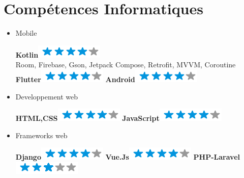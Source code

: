 \documentclass[]{friggeri-cv}
\begin{document}
\section{Compétences Informatiques}
        \vspace*{-0.45cm}
        \setlength{\columnsep}{-0.3cm}
        \begin{flushright}
        \begin{multicols}{3}
		\begin{itemize}
		
		\setlength{\itemsep}{1pt}
  		\setlength{\parskip}{0pt}
  		\setlength{\parsep}{0pt}
          
        
\item Mobile \
\begin{flushright}

\textbf{Kotlin}\includegraphics[scale=0.40]{res/img/4stars.png}\\Room, Firebase, Gson, Jetpack Compose, Retrofit, MVVM, Coroutine\\\vspace{2mm}
\textbf{Flutter}\includegraphics[scale=0.40]{res/img/4stars.png}
\textbf{Android}\includegraphics[scale=0.40]{res/img/4stars.png}
\end{flushright}            

\item Developpement web \
\begin{flushright}

\textbf{HTML,CSS}\includegraphics[scale=0.40]{res/img/4stars.png}
\textbf{JavaScript}\includegraphics[scale=0.40]{res/img/4stars.png}
\end{flushright}            

\item Frameworks web \
\begin{flushright}

\textbf{Django}\includegraphics[scale=0.40]{res/img/4stars.png}
\textbf{Vue.Js}\includegraphics[scale=0.40]{res/img/4stars.png}
\textbf{PHP-Laravel}\includegraphics[scale=0.40]{res/img/3stars.png}
\end{flushright}            


\end{itemize}
\end{multicols}
\end{flushright}
\end{document}
